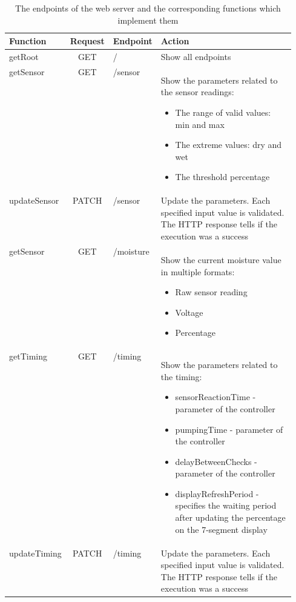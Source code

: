 \begin{table}[ht]
 \centering
 \begin{tabular}{| l | c | l | p{0.55\linewidth} |} 
    \hline
    Function & Request & Endpoint & Action \\ [0.5ex] 
    \hline\hline
    getRoot & GET & / & Show all endpoints\\ 
    \hline
    getSensor & GET & /sensor & Show the parameters related to the sensor readings:
    \begin{itemize}
     \item The range of valid values: min and max
     \item The extreme values: dry and wet
     \item The threshold percentage
    \end{itemize}\\ 
    \hline
    updateSensor & PATCH & /sensor & Update the parameters. Each specified input value is validated. The HTTP response tells if the execution was a success\\ 
    \hline
    getSensor & GET & /moisture & Show the current moisture value in multiple formats:
    \begin{itemize}
     \item Raw sensor reading
     \item Voltage 
     \item Percentage
    \end{itemize}\\ 
    \hline
    getTiming & GET & /timing & Show the parameters related to the timing:
    \begin{itemize}
     \item sensorReactionTime - parameter of the controller
     \item pumpingTime - parameter of the controller
     \item delayBetweenChecks - parameter of the controller
     \item displayRefreshPeriod - specifies the waiting period after updating the percentage on the 7-segment display
    \end{itemize}\\ 
    \hline
    updateTiming & PATCH & /timing & Update the parameters. Each specified input value is validated. The HTTP response tells if the execution was a success\\ [1ex] 
    \hline
 \end{tabular}
 \caption{The endpoints of the web server and the corresponding functions which implement them}
 \label{tab:enpoints}
\end{table}






